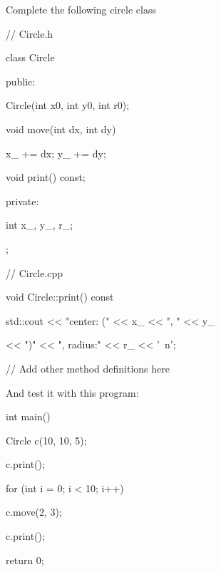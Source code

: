 Complete the following circle class

\begin{console}

// Circle.h

class Circle

{     

public: 

       Circle(int x0, int y0, int r0);



       void move(int dx, int dy)

       {

           x_ += dx; y_ += dy;

       }

       

       void print() const;



private:

        int x_, y_, r_;

}; 

\end{console}

\begin{console}

// Circle.cpp

void Circle::print() const

{

std::cout << "center: (" << x_ << ", " << y_

          << ")" << ", radius:" << r_ << '\ n';

}



// Add other method definitions here

\end{console}



And test it with this program:

\begin{console}

int main()

{   

    Circle c(10, 10, 5);

    c.print();

    for (int i = 0; i < 10; i++)

    {   

        c.move(2, 3);

        c.print();

    }

    return 0;

}

\end{console}



